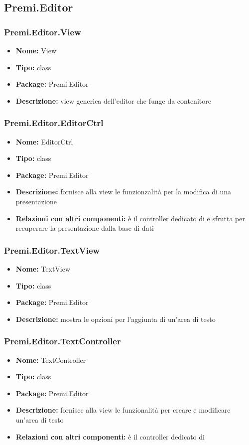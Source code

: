 \subsection{Premi.Editor}
\subsubsection{Premi.Editor.View}
\begin{itemize}
  \item \textbf{Nome:} View
  \item \textbf{Tipo:} class
  \item \textbf{Package:} Premi.Editor
  \item \textbf{Descrizione:} view generica dell'editor che funge da contenitore
\end{itemize}
\subsubsection{Premi.Editor.EditorCtrl}
\begin{itemize}
  \item \textbf{Nome:} EditorCtrl
  \item \textbf{Tipo:} class
  \item \textbf{Package:} Premi.Editor
  \item \textbf{Descrizione:} fornisce alla view le funzionzalità per la modifica di una presentazione
  \item \textbf{Relazioni con altri componenti:} è il controller dedicato di   e sfrutta  per recuperare la presentazione dalla base di dati
\end{itemize}
\subsubsection{Premi.Editor.TextView}
\begin{itemize}
  \item \textbf{Nome:} TextView
  \item \textbf{Tipo:} class
  \item \textbf{Package:} Premi.Editor
  \item \textbf{Descrizione:} mostra le opzioni per l'aggiunta di un'area di testo
\end{itemize}
\subsubsection{Premi.Editor.TextController}
\begin{itemize}
  \item \textbf{Nome:} TextController
  \item \textbf{Tipo:} class
  \item \textbf{Package:} Premi.Editor
  \item \textbf{Descrizione:} fornisce alla view le funzionalità per creare e modificare un'area di testo
  \item \textbf{Relazioni con altri componenti:} è il controller dedicato di  
\end{itemize}
